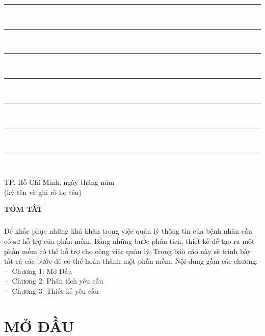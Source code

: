 \documentclass{report}
\newcommand\tab[1][1.25cm]{\hspace*{#1}}
\begin{document}
\rule{17cm}{1pt}\\
\rule{17cm}{1pt}\\
\rule{17cm}{1pt}\\
\rule{17cm}{1pt}\\
\rule{17cm}{1pt}\\
\rule{17cm}{1pt}\\
\rule{17cm}{1pt}\\
\begin{flushright}
	TP. Hồ Chí Minh, ngày \tab[1cm] tháng \tab[1cm] năm \tab[1cm]\tab \\
	(ký tên và ghi rõ họ tên)\tab[2cm] \\
	\vspace{1.5cm}
\end{flushright}
\pagebreak
\begin{center}
	\fontsize{16}{20}\selectfont
	\textbf{TÓM TẮT}\\
\end{center}
\fontsize{13}{15}\selectfont
\paragraph{}
Để khắc phục những khó khăn trong việc quản lý thông tin của bệnh nhân cần có sự hỗ trợ của phần mềm. Bằng những bước  phân tích, thiết kế để tạo ra một phần mềm có thể hỗ trợ cho công việc quản lý. Trong báo cáo này sẽ trình bày tất cả các bước để có thể hoàn thành một phần mềm. Nội dung gồm các chương:\\
· Chương 1: Mở Đầu\\
· Chương 2: Phân tích yêu cầu\\
· Chương 3: Thiết kế yêu cầu
\pagebreak


\fontsize{13}{15}\selectfont
\pagebreak
\fontsize{13}{20}\selectfont
\tableofcontents

\fontsize{13}{15}\selectfont
\listoftables

\fontsize{13}{15}\selectfont
\listoffigures

\setcounter{page}{1}
\chapter{MỞ ĐẦU}
\end{document}

